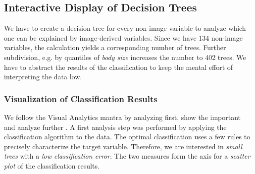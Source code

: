 \documentclass[a4paper,twoside]{style/article}
\begin{document}
\subsection{Interactive Display of Decision Trees}
We have to create a decision tree for every non-image variable to analyze which one can be explained by image-derived variables.
Since we have 134 non-image variables, the calculation yields a corresponding number of trees.
Further subdivision, e.g. by quantiles of \emph{body size} increases the number to 402 trees.
We have to abstract the results of the classification to keep the mental effort of interpreting the data low.
\subsubsection{Visualization of Classification Results}
\label{subsec:VisualizationOfClassificationResults}
We follow the Visual Analytics mantra by analyzing first, show the important and analyze further \cite{Keim}.
A first analysis step was performed by applying the classification algorithm to the data.
The optimal classification uses a few rules to precisely characterize the target variable.
Therefore, we are interested in \emph{small trees} with a \emph{low classification error}.
The two measures form the axis for a \emph{scatter plot} of the classification results.
\end{document}
